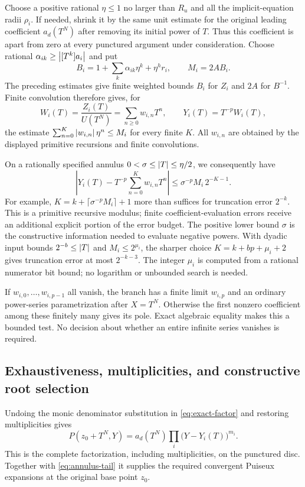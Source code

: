 Choose a positive rational $\eta\le1$ no larger than $R_u$ and all
the implicit-equation radii $\rho_i$. If needed, shrink it by the same
unit estimate for the original leading coefficient $a_d(T^N)$ after
removing its initial power of $T$. Thus this coefficient is apart from
zero at every punctured argument under consideration.
Choose rational $\alpha_{ik}\ge\left|[T^k]a_i\right|$ and put
\[
 B_i=1+\sum_k\alpha_{ik}\eta^k+\eta^h r_i,
 \qquad M_i=2AB_i.
\]
The preceding estimates give finite weighted bounds $B_i$ for $Z_i$
and $2A$ for $B^{-1}$. Finite convolution therefore gives, for
\[
 W_i(T)=\frac{Z_i(T)}{U(T^N)}=\sum_{n\ge0}w_{i,n}T^n,
 \qquad Y_i(T)=T^{-p}W_i(T),
\]
the estimate $\sum_{n=0}^{K}\left|w_{i,n}\right|\eta^n\le M_i$ for every
finite $K$. All $w_{i,n}$ are obtained by the displayed primitive
recursions and finite convolutions.

On a rationally specified annulus
$0<\sigma\le\left|T\right|\le\eta/2$, we consequently have
\begin{equation}
 \left|Y_i(T)-T^{-p}\sum_{n=0}^{K}w_{i,n}T^n\right|
 \le \sigma^{-p}M_i\,2^{-K-1}.
 \label{eq:annulus-tail}
\end{equation}
For example, $K=k+\lceil\sigma^{-p}M_i\rceil+1$ more than suffices
for truncation error $2^{-k}$. This is a primitive recursive modulus;
finite coefficient-evaluation errors receive an additional explicit portion
of the error budget. The positive lower bound $\sigma$ is the constructive
information needed to evaluate negative powers.
With dyadic input bounds \(2^{-b}\le\left|T\right|\) and \(M_i\le2^{\mu_i}\),
the sharper choice \(K=k+bp+\mu_i+2\) gives truncation error at most
\(2^{-k-3}\). The integer \(\mu_i\) is computed from a rational numerator
bit bound; no logarithm or unbounded search is needed.

If $w_{i,0},\ldots,w_{i,p-1}$ all vanish, the branch has a finite
limit $w_{i,p}$ and an ordinary power-series parametrization after
$X=T^N$. Otherwise the first nonzero coefficient among these finitely
many gives its pole. Exact algebraic equality makes this a bounded test.
No decision about whether an entire infinite series vanishes is required.

\subsection{Exhaustiveness, multiplicities, and constructive root selection}

Undoing the monic denominator substitution in
\eqref{eq:exact-factor} and restoring multiplicities gives
\[
 P(z_0+T^N,Y)=a_d(T^N)\prod_i\bigl(Y-Y_i(T)\bigr)^{m_i}.
\]
This is the complete factorization, including multiplicities, on the
punctured disc. Together with \eqref{eq:annulus-tail} it supplies the
required convergent Puiseux expansions at the original base point \(z_0\).

